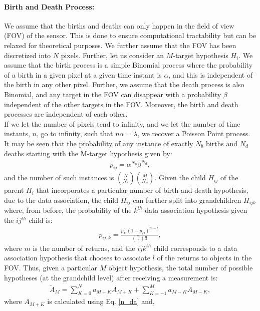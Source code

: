 \documentclass[10pt, conference]{IEEEtran}
\begin{document}
\paragraph{Birth and Death Process:} We assume that the births and deaths can only happen in the field of view (FOV) of the sensor. This is done to ensure computational tractability but can be relaxed for theoretical purposes. We further assume that the FOV has been discretized into $N$ pixels. Further, let us consider an $M$-target hypothesis $H_i$. We assume that the birth process is a simple Binomial process where the probability of a birth in a given pixel at a given time instant is $\alpha$, and this is independent of the birth in any other pixel. Further, we  assume that the death process is also Binomial, and any target in the FOV can disappear with a probability $\beta$ independent of the other targets in the FOV. Moreover, the birth and death processes are independent of each other. \\
If we let the number of pixels tend to infinity, and we let the number of time instants, $n$, go to infinity, such that $n\alpha = \lambda$, we recover a Poisson Point process.\\
It may be seen that the probability of any instance of exactly $N_b$ births and $N_d$ deaths starting with the M-target hypothesis given by:
\begin{align}
p_{ij} = \alpha^{N_b}\beta^{N_d},
\end{align}
and the number of such instances is ${N\choose {N_b}} {M\choose {N_d}}$. Given the child $H_{ij}$ of the parent $H_i$ that incorporates a particular number of birth and death hypothesis, due to the data association, the child $H_{ij}$ can further split into grandchildren $H_{ijk}$ where, from before, the probability of the $k^{th}$ data association hypothesis given the $ij^{th}$ child is:
\begin{align}
p_{ij, k} = \frac{p_D^l (1-p_D)^{m-l}}{{m\choose l} l!},
\end{align}
where $m$ is the number of returns, and the $ijk^{th}$ child corresponds to a data association hypothesis that chooses to associate $l$ of the returns to objects in the FOV. 
Thus, given a particular $M$ object hypothesis, the total number of possible hypotheses (at the grandchild level) after receiving a measurement is:
\begin{align}\label{n_da_m}
\widetilde{A}_{M} = \sum_{K=0}^{N} {a_{M+K}} {A_{M+K}} + \sum_{K=-1}^M a_{M-K} A_{M-K}, 
\end{align}
where $A_{M+K}$ is calculated using Eq. \ref{n_da} and,
\end{document}
